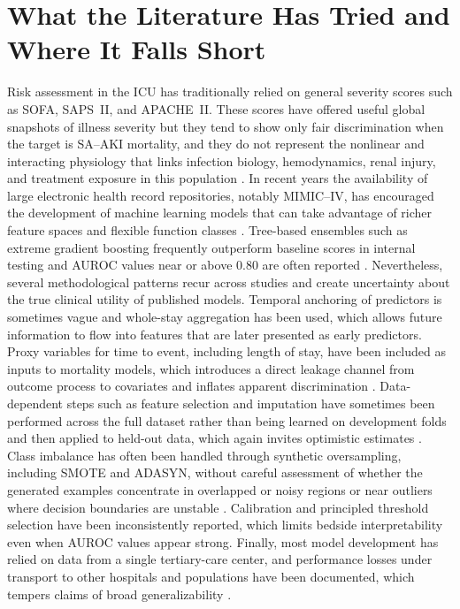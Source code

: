 \section{What the Literature Has Tried and Where It Falls Short} Risk assessment in the ICU has traditionally relied on general severity scores such as SOFA, SAPS~II, and APACHE~II. These scores have offered useful global snapshots of illness severity but they tend to show only fair discrimination when the target is SA--AKI mortality, and they do not represent the nonlinear and interacting physiology that links infection biology, hemodynamics, renal injury, and treatment exposure in this population \citep{Luo_2022,Qu_2024}. In recent years the availability of large electronic health record repositories, notably MIMIC--IV, has encouraged the development of machine learning models that can take advantage of richer feature spaces and flexible function classes \citep{Johnson_2023_MIMIC}. Tree-based ensembles such as extreme gradient boosting frequently outperform baseline scores in internal testing and AUROC values near or above 0.80 are often reported \citep{Chen_2025,Qu_2024,Wang_2024}. Nevertheless, several methodological patterns recur across studies and create uncertainty about the true clinical utility of published models. Temporal anchoring of predictors is sometimes vague and whole-stay aggregation has been used, which allows future information to flow into features that are later presented as early predictors. Proxy variables for time to event, including length of stay, have been included as inputs to mortality models, which introduces a direct leakage channel from outcome process to covariates and inflates apparent discrimination \citep{Chen_2025}. Data-dependent steps such as feature selection and imputation have sometimes been performed across the full dataset rather than being learned on development folds and then applied to held-out data, which again invites optimistic estimates \citep{Kang_Yoon_2023}. Class imbalance has often been handled through synthetic oversampling, including SMOTE and ADASYN, without careful assessment of whether the generated examples concentrate in overlapped or noisy regions or near outliers where decision boundaries are unstable \citep{Chawla_2002,He_2008,Blagus_2013,Saez_2015,Krawczyk_2016}. Calibration and principled threshold selection have been inconsistently reported, which limits bedside interpretability even when AUROC values appear strong. Finally, most model development has relied on data from a single tertiary-care center, and performance losses under transport to other hospitals and populations have been documented, which tempers claims of broad generalizability \citep{Johnson_2023_MIMIC,Rockenschaub_2024}.

